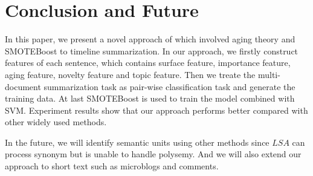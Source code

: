 \documentclass[print]{jicspack}
\begin{document}
%
\section{Conclusion and Future}
%

In this paper, we present a novel approach of which involved aging theory and SMOTEBoost to timeline summarization. In our approach, we firstly construct features of each sentence, which contains surface feature, importance feature, aging feature, novelty feature and topic feature. Then we treate the multi-document summarization task as pair-wise classification task and generate the training data. At last SMOTEBoost is used to train the model combined with SVM. Experiment results show that our approach performs better compared with other widely used methods.

In the future, we will identify semantic units using other methods since $LSA$ can process synonym but is unable to handle polysemy. And we will also extend our approach to short text such as microblogs and comments.



\begin{thebibliography}{00}
%	
	
\end{thebibliography}
\end{document}
